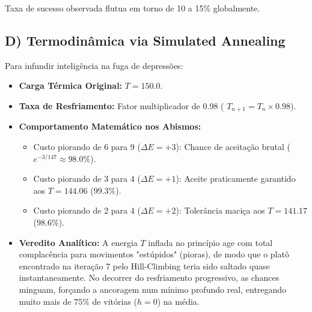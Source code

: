 Taxa de sucesso observada flutua em torno de 10 a 15\% globalmente.

\subsection*{D) Termodinâmica via Simulated Annealing}

Para infundir inteligência na fuga de depressões:
\begin{itemize}
    \item \textbf{Carga Térmica Original:} $T = 150.0$.
    \item \textbf{Taxa de Resfriamento:} Fator multiplicador de $0.98$ ( $T_{n+1} = T_n \times 0.98$).
    \item \textbf{Comportamento Matemático nos Abismos:}
    \begin{itemize}
        \item Custo piorando de 6 para 9 ($\Delta E = +3$): Chance de aceitação brutal ($e^{-3/147} \approx 98.0\%$).
        \item Custo piorando de 3 para 4 ($\Delta E = +1$): Aceite praticamente garantido aos $T=144.06$ ($99.3\%$).
        \item Custo piorando de 2 para 4 ($\Delta E = +2$): Tolerância maciça aos $T=141.17$ ($98.6\%$).
    \end{itemize}
    \item \textbf{Veredito Analítico:} A energia $T$ inflada no princípio age com total complacência para movimentos "estúpidos" (pioras), de modo que o platô encontrado na iteração 7 pelo Hill-Climbing teria sido saltado quase instantaneamente. No decorrer do resfriamento progressivo, as chances minguam, forçando a ancoragem num mínimo profundo real, entregando muito mais de $75\%$ de vitórias ($h=0$) na média.
\end{itemize}
